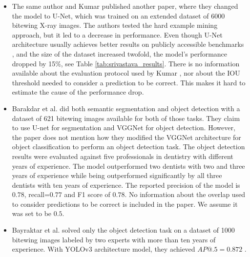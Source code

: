 \begin{itemize}
    \item{The same author and Kumar \cite{Kumar2018}} published another paper, where they changed the model to U-Net, which was trained on an extended dataset of 6000 bitewing X-ray images. The authors tested the hard example mining approach, but it led to a decrease in performance. Even though U-Net architecture usually achieves better results on publicly accessible benchmarks \cite{paperwithcode, Zhang2019}, and the size of the dataset increased twofold, the model's performance dropped by 15\%, see Table \ref{tab:srivastava_results}. There is no information available about the evaluation protocol used by Kumar \cite{Kumar2018}, nor about the IOU threshold needed to consider a prediction to be correct. This makes it hard to estimate the cause of the performance drop.
    \item{Barakdar et al. \cite{Bayrakdar2021}} did both semantic segmentation and object detection with a dataset of 621 bitewing images available for both of those tasks. They claim to use U-net for segmentation and VGGNet for object detection. However, the paper does not mention how they modified the VGGNet architecture for object classification to perform an object detection task. The object detection results were evaluated against five professionals in dentistry with different years of experience. The model outperformed two dentists with two and three years of experience while being outperformed significantly by all three dentists with ten years of experience. The reported precision of the model is $0.78$, recall=$0.77$ and F1 score of $0.78$. No information about the overlap used to consider predictions to be correct is included in the paper. We assume it was set to be $0.5$.
    \item{Bayraktar et al. \cite{Bayraktar2021}} solved only the object detection task on a dataset of 1000 bitewing images labeled by two experts with more than ten years of experience. With YOLOv3 architecture model, they achieved $AP@.5 = 0.872$ .
\end{itemize}

